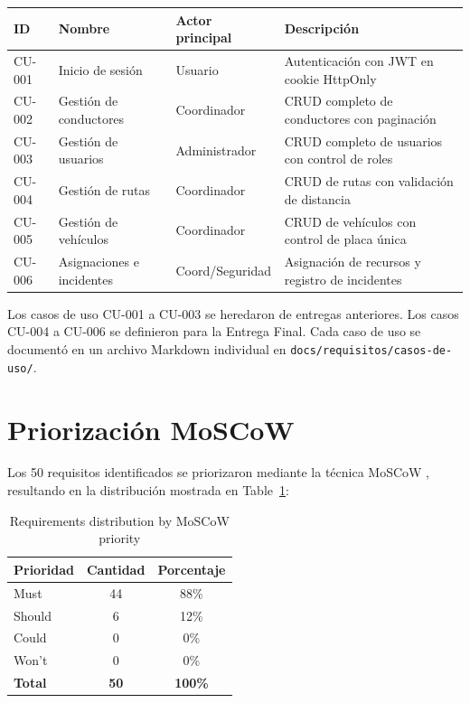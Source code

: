 \begin{longtable}{@{}p{1.5cm}p{3cm}p{3cm}p{6cm}@{}}
\toprule
\textbf{ID} & \textbf{Nombre} & \textbf{Actor principal} & \textbf{Descripción} \\
\midrule
\endhead
CU-001 & Inicio de sesión & Usuario & Autenticación con JWT en cookie HttpOnly \\
CU-002 & Gestión de conductores & Coordinador & CRUD completo de conductores con paginación \\
CU-003 & Gestión de usuarios & Administrador & CRUD completo de usuarios con control de roles \\
CU-004 & Gestión de rutas & Coordinador & CRUD de rutas con validación de distancia \\
CU-005 & Gestión de vehículos & Coordinador & CRUD de vehículos con control de placa única \\
CU-006 & Asignaciones e incidentes & Coord/Seguridad & Asignación de recursos y registro de incidentes \\
\bottomrule
\end{longtable}

Los casos de uso CU-001 a CU-003 se heredaron de entregas anteriores. Los casos CU-004 a CU-006 se definieron para la Entrega Final. Cada caso de uso se documentó en un archivo Markdown individual en \texttt{docs/requisitos/casos-de-uso/}.

\section{Priorización MoSCoW}
\label{sec:moscow-application}

Los 50 requisitos identificados se priorizaron mediante la técnica MoSCoW \cite{wiegers2013}, resultando en la distribución mostrada en Table~\ref{tab:moscow}:

\begin{table}[H]
\centering
\caption{Requirements distribution by MoSCoW priority}
\label{tab:moscow}
\begin{tabular}{lcc}
\toprule
\textbf{Prioridad} & \textbf{Cantidad} & \textbf{Porcentaje} \\
\midrule
Must & 44 & 88\% \\
Should & 6 & 12\% \\
Could & 0 & 0\% \\
Won't & 0 & 0\% \\
\midrule
\textbf{Total} & \textbf{50} & \textbf{100\%} \\
\bottomrule
\end{tabular}
\end{table}

